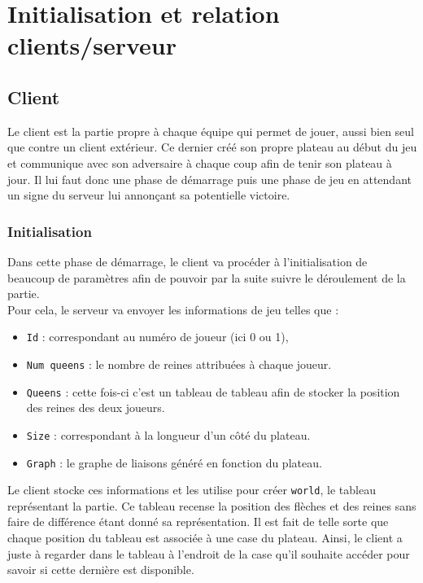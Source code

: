 \chapter{Initialisation et relation clients/serveur}
 
\section{Client}
Le client est la partie propre à chaque équipe qui permet de jouer, aussi bien seul que contre un client extérieur. Ce dernier créé son propre plateau au début du jeu et communique avec son adversaire à chaque coup afin de tenir son plateau à jour. Il lui faut donc une phase de démarrage puis une phase de jeu en attendant un signe du serveur lui annonçant sa potentielle victoire.
\subsection{Initialisation}
Dans cette phase de démarrage, le client va procéder à l'initialisation de beaucoup de paramètres afin de pouvoir par la suite suivre le déroulement de la partie.\\
Pour cela, le serveur va envoyer les informations de jeu telles que :
\begin{itemize}
    \item \texttt{Id} : correspondant au numéro de joueur (ici 0 ou 1),
    \item \texttt{Num queens} : le nombre de reines attribuées à chaque joueur.
    \item  \texttt{Queens} : cette fois-ci c'est un tableau de tableau afin de stocker la position des reines des deux joueurs.
    \item  \texttt{Size} : correspondant à la longueur d'un côté du plateau.
    \item  \texttt{Graph} : le graphe de liaisons généré en fonction du plateau.
\end{itemize}

\bigbreak

Le client stocke ces informations et les utilise pour créer \texttt{world}, le tableau représentant la partie. Ce tableau recense la position des flèches et des reines sans faire de différence étant donné sa représentation. Il est fait de telle sorte que chaque position du tableau est associée à une case du plateau. Ainsi, le client a juste à regarder dans le tableau à l'endroit de la case qu'il souhaite accéder pour savoir si cette dernière est disponible. 

